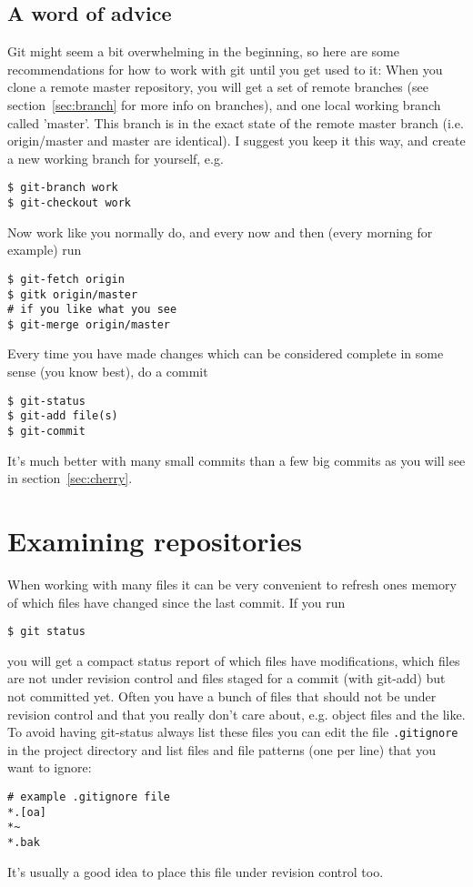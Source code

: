 \documentclass[a4paper,10pt]{article}
\begin{document}
\subsection{A word of advice}
Git might seem a bit overwhelming in the beginning, so here are
some recommendations for how to work with git until you get used to it:
When you clone a remote master repository, you will get a set of remote
branches (see section~\ref{sec:branch} for more info on branches), and one
local working branch called 'master'. This branch is in the exact state of
the remote master branch (i.e. origin/master and master are identical). I
suggest you keep it this way, and create a new working branch for yourself, 
e.g. 
\begin{verbatim}
$ git-branch work
$ git-checkout work 
\end{verbatim}
Now work like you normally do, and every now and then (every morning for
example) run
\begin{verbatim}
$ git-fetch origin
$ gitk origin/master
# if you like what you see
$ git-merge origin/master 
\end{verbatim}
Every time you have made changes which can be considered complete in some
sense (you know best), do a commit 
\begin{verbatim}
$ git-status
$ git-add file(s)
$ git-commit 
\end{verbatim}
It's much better with many small commits
than a few big commits as you will see in section~\ref{sec:cherry}.

\section{Examining repositories}
\label{sec:examine}
When working with many files it can be very convenient to refresh ones memory
of which files have changed since the last commit. If you run
\begin{verbatim}
$ git status
\end{verbatim}
you will get a compact status report of which files have modifications, which
files are not under revision control and files staged for a commit (with
git-add) but not committed yet. Often you have a bunch of files that should
not be under revision control and that you really don't care about, e.g.
object files and the like. To avoid having git-status always list these files
you can edit the file \texttt{.gitignore} in the project directory and list
files and file patterns (one per line) that you want to ignore:
\begin{verbatim}
# example .gitignore file
*.[oa]
*~
*.bak

\end{verbatim}
It's usually a good idea to place this file under revision control too.
\end{document}
